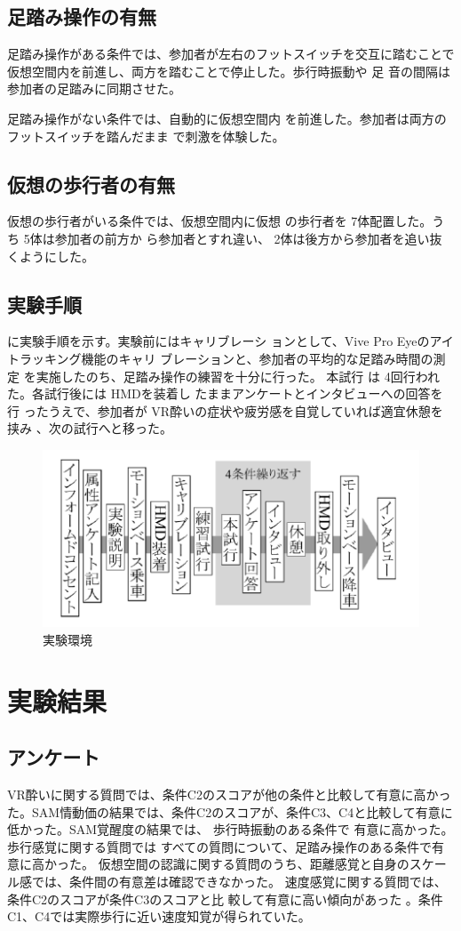 \documentclass[uplatex]{jsarticle}   %
\begin{document}
\subsection{足踏み操作の有無}
足踏み操作がある条件では、参加者が左右のフットスイッチを交互に踏むことで仮想空間内を前進し、両方を踏むことで停止した。歩行時振動や 足 音の間隔は参加者の足踏みに同期させた。

足踏み操作がない条件では、自動的に仮想空間内
を前進した。参加者は両方のフットスイッチを踏んだまま
で刺激を体験した。

\subsection{仮想の歩行者の有無}
仮想の歩行者がいる条件では、仮想空間内に仮想
の歩行者を 7体配置した。うち 5体は参加者の前方か
ら参加者とすれ違い、 2体は後方から参加者を追い抜
くようにした。

\subsection{実験手順}
に実験手順を示す。実験前にはキャリブレーシ
ョンとして、Vive Pro Eyeのアイトラッキング機能のキャリ
ブレーションと、参加者の平均的な足踏み時間の測定
を実施したのち、足踏み操作の練習を十分に行った。
本試行 は 4回行われた。各試行後には HMDを装着し
たままアンケートとインタビューへの回答を行 ったうえで、参加者が VR酔いの症状や疲労感を自覚していれば適宜休憩を挟み 、次の試行へと移った。

\begin{figure}[h]
    \centering
    \includegraphics{rinkou_figure_4.png}
    \caption{実験環境}
    \label{fig:my_label_4}
\end{figure}
\section{実験結果}
\subsection{アンケート}
VR酔いに関する質問では、条件C2のスコアが他の条件と比較して有意に高かった。SAM\cite{文献18}情動価の結果では、条件C2のスコアが、条件C3、C4と比較して有意に低かった。SAM覚醒度の結果では、 歩行時振動のある条件で 有意に高かった。
歩行感覚に関する質問では すべての質問について、足踏み操作のある条件で有意に高かった。
仮想空間の認識に関する質問のうち、距離感覚と自身のスケール感では、条件間の有意差は確認できなかった。
速度感覚に関する質問では、条件C2のスコアが条件C3のスコアと比
較して有意に高い傾向があった 。条件C1、C4では実際歩行に近い速度知覚が得られていた。
\end{document}
